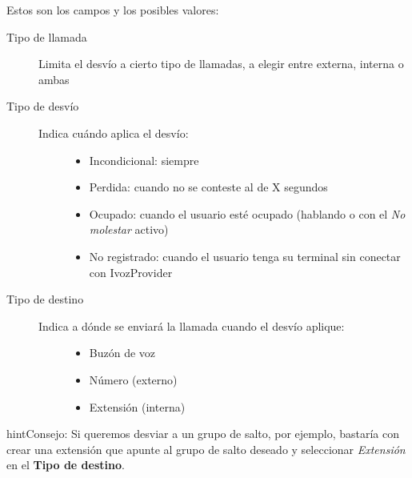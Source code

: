 \documentclass[letterpaper,10pt,spanish]{sphinxmanual}
\begin{document}
Estos son los campos y los posibles valores:
\begin{description}
\item[{Tipo de llamada}] \leavevmode{}\label{pbx_features/users:term-call-type}
Limita el desvío a cierto tipo de llamadas, a elegir entre externa, interna o ambas

\item[{Tipo de desvío}] \leavevmode{}\label{pbx_features/users:term-forward-type}\begin{description}
\item[{Indica cuándo aplica el desvío:}] \leavevmode\begin{itemize}
\item {} 
Incondicional: siempre

\item {} 
Perdida: cuando no se conteste al de X segundos

\item {} 
Ocupado: cuando el usuario esté ocupado (hablando o con el \emph{No molestar} activo)

\item {} 
No registrado: cuando el usuario tenga su terminal sin conectar con IvozProvider

\end{itemize}

\end{description}

\item[{Tipo de destino}] \leavevmode{}\label{pbx_features/users:term-target-type}\begin{description}
\item[{Indica a dónde se enviará la llamada cuando el desvío aplique:}] \leavevmode\begin{itemize}
\item {} 
Buzón de voz

\item {} 
Número (externo)

\item {} 
Extensión (interna)

\end{itemize}

\end{description}

\end{description}

\begin{notice}{hint}{Consejo:}
Si queremos desviar a un grupo de salto, por ejemplo, bastaría con crear una extensión que apunte al grupo de salto deseado y seleccionar \emph{Extensión} en el \textbf{Tipo de destino}.
\end{notice}
\end{document}
